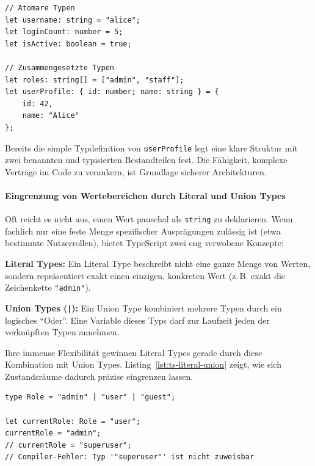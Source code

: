 \begin{listing}[htbp]
    \caption{Atomare und zusammengesetzte TypeScript-Typen}
    \label{lst:ts-basic-types}
    \begin{verbatim}
// Atomare Typen
let username: string = "alice";
let loginCount: number = 5;
let isActive: boolean = true;

// Zusammengesetzte Typen
let roles: string[] = ["admin", "staff"];
let userProfile: { id: number; name: string } = {
    id: 42,
    name: "Alice"
};
    \end{verbatim}
\end{listing}

Bereits die simple Typdefinition von \texttt{userProfile} legt eine klare Struktur mit zwei benannten und typisierten Bestandteilen fest. Die Fähigkeit, komplexe Verträge im Code zu verankern, ist Grundlage sicherer Architekturen.

\paragraph{Eingrenzung von Wertebereichen durch Literal und Union Types}
\label{par:literal-und-union-types}

Oft reicht es nicht aus, einen Wert pauschal als \texttt{string} zu deklarieren. Wenn fachlich nur eine feste Menge spezifischer Ausprägungen zulässig ist (etwa bestimmte Nutzerrollen), bietet TypeScript zwei eng verwobene Konzepte:

\begin{definition}
\label{def:ts-literal-types}
\textbf{Literal Types:} Ein Literal Type beschreibt nicht eine ganze Menge von Werten, sondern repräsentiert exakt einen einzigen, konkreten Wert (z.\,B. exakt die Zeichenkette \texttt{"admin"}).
\end{definition}

\begin{definition}
\label{def:ts-union-types}
\textbf{Union Types (\texttt{|}):} Ein Union Type kombiniert mehrere Typen durch ein logisches \enquote{Oder}. Eine Variable dieses Typs darf zur Laufzeit jeden der verknüpften Typen annehmen.
\end{definition}

Ihre immense Flexibilität gewinnen Literal Types gerade durch diese Kombination mit Union Types. Listing~\ref{lst:ts-literal-union} zeigt, wie sich Zustandsräume dadurch präzise eingrenzen lassen.

\begin{listing}[htbp]
    \caption{Union Type aus Literal Types in TypeScript}
    \label{lst:ts-literal-union}
    \begin{verbatim}
type Role = "admin" | "user" | "guest";

let currentRole: Role = "user";
currentRole = "admin";
// currentRole = "superuser"; 
// Compiler-Fehler: Typ '"superuser"' ist nicht zuweisbar
    \end{verbatim}
\end{listing}

